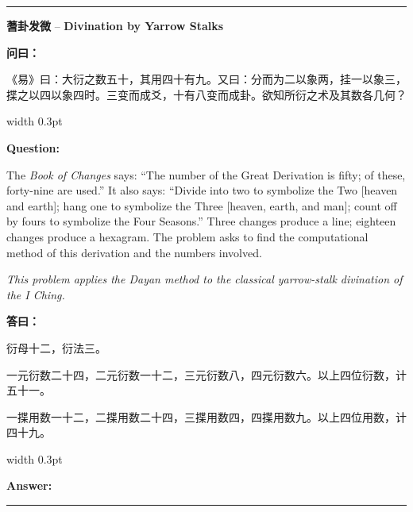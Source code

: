 \documentclass[10pt,a4paper]{article}
\newcommand{\cnlabel}[1]{\textcolor{labelcolor}{\textbf{#1}}}
\newcommand{\enlabel}[1]{\textcolor{labelcolor}{\textbf{#1}}}
\newenvironment{problemsection}{%
  \medskip\par\noindent\textcolor{rulecolor}{\rule{\textwidth}{0.4pt}}\par\smallskip%
}{\par\smallskip\noindent\textcolor{rulecolor}{\rule{\textwidth}{0.4pt}}\par\medskip}
\begin{document}
\begin{problemsection}

\noindent\begin{minipage}[t]{\textwidth}
\begin{center}
\textbf{蓍卦发微} -- \textbf{Divination by Yarrow Stalks}
\end{center}
\end{minipage}

\vspace{0.3em}

\noindent\begin{minipage}[t]{0.47\textwidth}
\begin{flushleft}
\small
\cnlabel{问曰：}

《易》曰：大衍之数五十，其用四十有九。又曰：分而为二以象两，挂一以象三，揲之以四以象四时。三变而成爻，十有八变而成卦。欲知所衍之术及其数各几何？
\end{flushleft}
\end{minipage}%
\hfill\vrule width 0.3pt\hfill%
\begin{minipage}[t]{0.47\textwidth}
\begin{flushleft}
\small
\enlabel{Question:}

The \textit{Book of Changes} says: ``The number of the Great Derivation is fifty; of these, forty-nine are used.'' It also says: ``Divide into two to symbolize the Two [heaven and earth]; hang one to symbolize the Three [heaven, earth, and man]; count off by fours to symbolize the Four Seasons.'' Three changes produce a line; eighteen changes produce a hexagram. The problem asks to find the computational method of this derivation and the numbers involved.

\textit{This problem applies the Dayan method to the classical yarrow-stalk divination of the I Ching.}
\end{flushleft}
\end{minipage}

\vspace{0.3em}

\noindent\begin{minipage}[t]{0.47\textwidth}
\begin{flushleft}
\small
\cnlabel{答曰：}

衍母十二，衍法三。

一元衍数二十四，二元衍数一十二，三元衍数八，四元衍数六。以上四位衍数，计五十一。

一揲用数一十二，二揲用数二十四，三揲用数四，四揲用数九。以上四位用数，计四十九。
\end{flushleft}
\end{minipage}%
\hfill\vrule width 0.3pt\hfill%
\begin{minipage}[t]{0.47\textwidth}
\begin{flushleft}
\small
\enlabel{Answer:}


\end{flushleft}
\end{minipage}
\end{problemsection}
\end{document}
